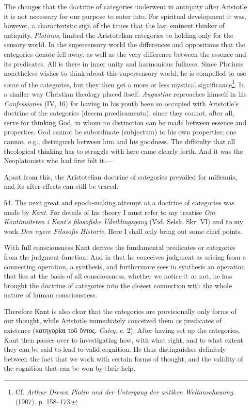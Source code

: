 \documentclass[12pt,a4paper]{book}
\newcommand{\opage}[1]{\marginnote{\footnotesize\textit{[#1]}}}
\begin{document}
The changes that the doctrine of categories underwent in antiquity after
Aristotle it is not necessary for our purpose to enter into. For spiritual
development it was, however, a characteristic sign of the times that the
last eminent thinker of antiquity, \emph{Plotinus}, limited the
Aristotelian categories to holding only for the sensory world. In the
supersensory world the differences and oppositions that the categories
denote fell away, as well as the very difference between the essence and
its predicates. All is there in inner unity and harmonious fullness. Since
Plotinus nonetheless wishes to think about this supersensory world, he is
compelled to use some of the categories, but they then get a more or less
mystical significance\footnote{Cf. \emph{Arthur Drews}: \emph{Plotin und
der Untergang der antiken Weltanschauung}. (1907). p. 158--173.}. In a
similar way Christian theology placed itself. \emph{Augustine} reproaches
himself in his \emph{Confessiones} (IV, 16) for having in his youth been so
occupied with Aristotle's doctrine of the categories (decem prædicamenta),
since they cannot, after all, serve for thinking God, in whom no
distinction can be made between essence and properties. God cannot be
subordinate (subjectum) to his own properties; one cannot, e.g.,
distinguish between him and his goodness. The difficulty that all
theological thinking has to struggle with here came clearly forth. And it
was the Neoplatonists who had first felt it.---

Apart from this, the Aristotelian doctrine of categories prevailed for
millennia, and its after-effects can still be traced.

\opage{144}54. The next great and epoch-making attempt at a doctrine of categories was
made by \emph{Kant}. For details of his theory I must refer to my treatise
\emph{Om Kontinuiteten i Kant's filosofiske Udviklingsgang} (Vid. Selsk.
Skr. VI) and to my work \emph{Den nyere Filosofis Historie}. Here I shall
only bring out some chief points.

With full consciousness Kant derives the fundamental predicates or
categories from the judgment-function. And in that he conceives judgment as
arising from a connecting operation, a synthesis, and furthermore sees in
synthesis an operation that lies at the basis of all consciousness, whether
we notice it or not, he has brought the doctrine of categories into the closest connection with the whole nature of human consciousness.

Therefore Kant is also clear that the categories are provisionally only
forms of our thought, while Aristotle immediately conceived them as
predicates of existence (κατηγορίαι τοῦ ὄντος. \emph{Categ.} c. 2). After
having set up the categories, Kant then passes over to investigating how,
with what right, and to what extent they can be said to lead to valid
cognition. He thus distinguishes definitely between the fact that we work
with certain forms of thought, and the validity of the cognition that can
be won by their help.
\end{document}
